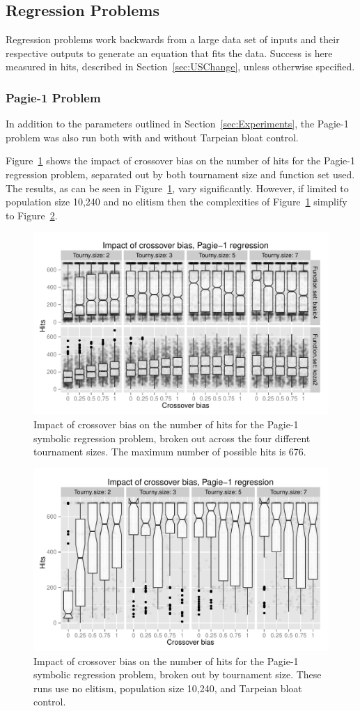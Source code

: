 \documentclass{sig-alternate}
\begin{document}
\subsection{Regression Problems}

Regression problems work backwards from a large data set of inputs and their respective outputs to generate an equation
that fits the data. Success is here measured in hits, described in Section~\ref{sec:USChange}, unless otherwise
specified.

\subsubsection{Pagie-1 Problem}

In addition to the parameters outlined in Section~\ref{sec:Experiments}, the Pagie-1 problem was also run both with and
without Tarpeian bloat control.

Figure~\ref{fig:Pagie1Hits_Bias_Tournys_FunctionSet} shows the impact of crossover bias on the number of hits for the
Pagie-1 regression problem, separated out by both tournament size and function set used. The results, as can be seen in
Figure~\ref{fig:Pagie1Hits_Bias_Tournys_FunctionSet}, vary significantly. However, if limited to population size 10,240
and no elitism then the complexities of Figure~\ref{fig:Pagie1Hits_Bias_Tournys_FunctionSet} simplify to
Figure~\ref{fig:Pagie1StrongHits_Bias_Tournys_FunctionSet}.

\begin{figure}[tb]
\centering
\includegraphics[width=0.45 \textwidth]{Plots/Pagie_1_Hits_vs_Bias_Tournys_FunctionSet.pdf}
\caption{Impact of crossover bias on the number of hits for the Pagie-1 symbolic regression problem, 
	broken out across the four different tournament sizes. The maximum number of possible hits is 676.}
\label{fig:Pagie1Hits_Bias_Tournys_FunctionSet}
\end{figure}

\begin{figure}[tb]
\centering
\includegraphics[width=0.45 \textwidth]{Plots/Pagie_1_strong_Hits_vs_Bias_Tournys_FunctionSet.pdf}
\caption{Impact of crossover bias on the number of hits for the Pagie-1 symbolic regression problem, 
	broken out by tournament size. These runs use no elitism, 
	population size 10,240, and Tarpeian bloat control.}
\label{fig:Pagie1StrongHits_Bias_Tournys_FunctionSet}
\end{figure}
\end{document}
